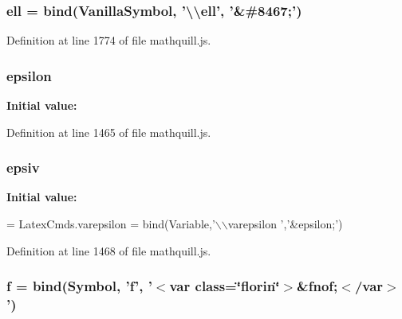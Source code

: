 \subsubsection[{ell}]{ ell = {\bf bind}({\bf Vanilla\-Symbol}, '\textbackslash{}\textbackslash{}ell', '\&\#8467;')}\label{mathquill_8js_a03affb6c0fd0b39ad40263d053f242ff}


Definition at line 1774 of file mathquill.\-js.

\subsubsection[{epsilon}]{ epsilon}\label{mathquill_8js_a89c21b5b7c4029b4667e0ae2bd64fd12}
{\bfseries Initial value\-:}


Definition at line 1465 of file mathquill.\-js.

\subsubsection[{epsiv}]{ epsiv}\label{mathquill_8js_a4cb3371e24a5c06467671e9c26262ca8}
{\bfseries Initial value\-:}
\begin{DoxyCode}
= 
LatexCmds.varepsilon = 
  bind(Variable,\textcolor{stringliteral}{'\(\backslash\)\(\backslash\)varepsilon '},\textcolor{stringliteral}{'&epsilon;'})
\end{DoxyCode}


Definition at line 1468 of file mathquill.\-js.

\subsubsection[{f}]{ f = {\bf bind}({\bf Symbol}, 'f', '$<$var class=\char`\"{}florin\char`\"{}$>$\&fnof;$<$/var$>$')}\label{mathquill_8js_a94de1088506c1708d03ecc7ef4e07e17}


